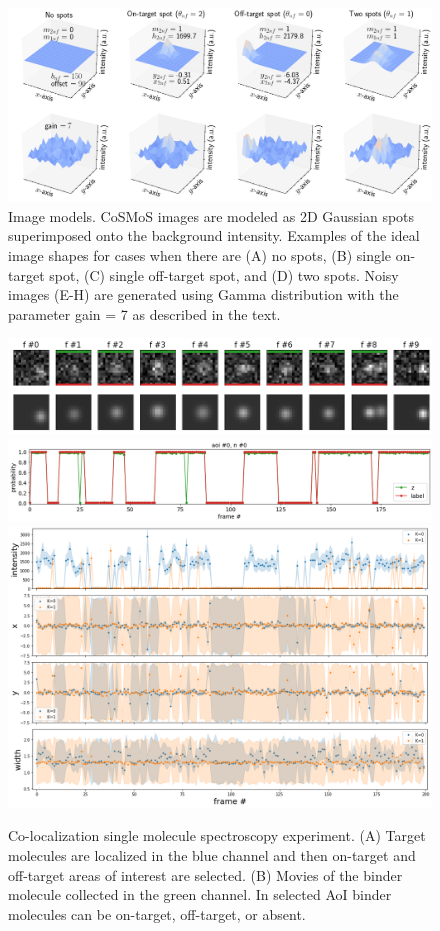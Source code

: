 \begin{figure}
\includegraphics[width=\linewidth]{figures/figure2.png}
\caption{Image models. CoSMoS images are modeled as 2D Gaussian spots superimposed onto the background intensity. Examples of the ideal image shapes for cases when there are (A) no spots, (B) single on-target spot, (C) single off-target spot, and (D) two spots. Noisy images (E-H) are generated using Gamma distribution with the parameter gain = 7 as described in the text.}
\label{fig:model}
\end{figure}

\begin{figure}
\includegraphics[width=\linewidth]{figures/figure3a.png}
\includegraphics[width=\linewidth]{figures/figure3b.png}
\includegraphics[width=\linewidth]{figures/figure3c.png}
\caption{Co-localization single molecule spectroscopy experiment. (A) Target molecules are localized in the blue channel and then on-target and off-target areas of interest are selected. (B) Movies of the binder molecule collected in the green channel. In selected AoI binder molecules can be on-target, off-target, or absent.}
\label{fig:view}
\end{figure}

